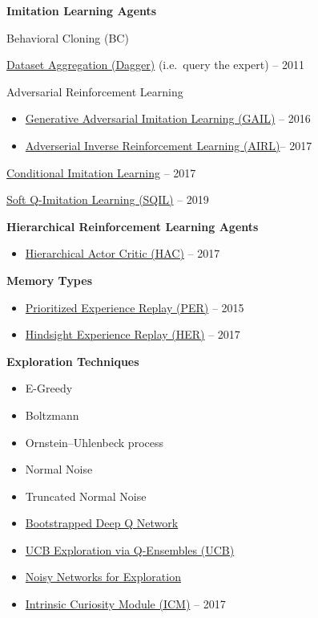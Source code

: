 \documentclass[
  a4paper,
  DIV=11,
  numbers=noendperiod]{scrreprt}
\providecommand{\tightlist}{%
  \setlength{\itemsep}{0pt}\setlength{\parskip}{0pt}}\usepackage{longtable,booktabs,array}
\begin{document}
\textbf{Imitation Learning Agents}

Behavioral Cloning (BC)

\href{https://www.cs.cmu.edu/~sross1/publications/Ross-AIStats11-NoRegret.pdf}{Dataset
Aggregation (Dagger)} (i.e.~query the expert) -- 2011

Adversarial Reinforcement Learning

\begin{itemize}
\tightlist
\item
  \href{https://arxiv.org/abs/1606.03476}{Generative Adversarial
  Imitation Learning (GAIL)} -- 2016
\item
  \href{https://arxiv.org/abs/1710.11248}{Adverserial Inverse
  Reinforcement Learning (AIRL)}-- 2017
\end{itemize}

\href{https://arxiv.org/abs/1710.02410}{Conditional Imitation Learning}
-- 2017

\href{https://arxiv.org/abs/1905.11108}{Soft Q-Imitation Learning
(SQIL)} -- 2019

\textbf{Hierarchical Reinforcement Learning Agents}

\begin{itemize}
\tightlist
\item
  \href{https://arxiv.org/abs/1712.00948.pdf}{Hierarchical Actor Critic
  (HAC)} -- 2017
\end{itemize}

\textbf{Memory Types}

\begin{itemize}
\tightlist
\item
  \href{https://arxiv.org/abs/1511.05952}{Prioritized Experience Replay
  (PER)} -- 2015
\item
  \href{https://arxiv.org/abs/1707.01495.pdf}{Hindsight Experience
  Replay (HER)} -- 2017
\end{itemize}

\textbf{Exploration Techniques}

\begin{itemize}
\tightlist
\item
  E-Greedy
\item
  Boltzmann
\item
  Ornstein--Uhlenbeck process
\item
  Normal Noise
\item
  Truncated Normal Noise
\item
  \href{https://arxiv.org/abs/1602.04621}{Bootstrapped Deep Q Network}~
\item
  \href{https://arxiv.org/abs/1706.01502}{UCB Exploration via
  Q-Ensembles (UCB)}~
\item
  \href{https://arxiv.org/abs/1706.10295}{Noisy Networks for
  Exploration}~
\item
  \href{https://pathak22.github.io/noreward-rl/}{Intrinsic Curiosity
  Module (ICM)} -- 2017
\end{itemize}
\end{document}
